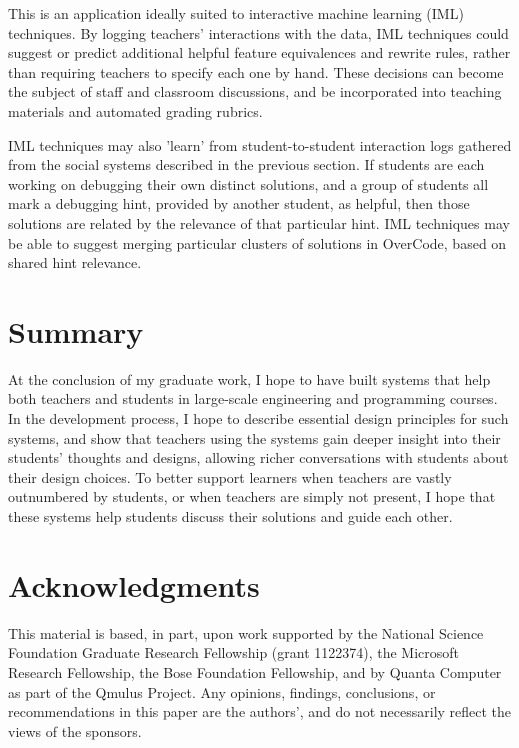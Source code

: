 \documentclass{sigchi}
\begin{document}
This is an application ideally suited to interactive machine learning (IML) techniques. By logging teachers' interactions with the data, IML techniques could suggest or predict additional helpful feature equivalences and rewrite rules, rather than requiring teachers to specify each one by hand. These decisions can become the subject of staff and classroom discussions, and be incorporated into teaching materials and automated grading rubrics.

IML techniques may also 'learn' from student-to-student interaction logs gathered from the social systems described in the previous section. If students are each working on debugging their own distinct solutions, and a group of students all mark a debugging hint, provided by another student, as helpful, then those solutions are related by the relevance of that particular hint. IML techniques may be able to suggest merging particular clusters of solutions in OverCode, based on shared hint relevance.

\section{Summary}
At the conclusion of my graduate work, I hope to have built systems that help both teachers and students in large-scale engineering and programming courses. In the development process, I hope to describe essential design principles for such systems, and show that teachers using the systems gain deeper insight into their students' thoughts and designs, allowing richer conversations with students about their design choices. To better support learners when teachers are vastly outnumbered by students, or when teachers are simply not present, I hope that these systems help students discuss their solutions and guide each other.

\section{Acknowledgments}

This material is based, in part, upon work supported by the National Science Foundation Graduate Research Fellowship (grant 1122374), the Microsoft Research Fellowship, the Bose Foundation Fellowship, and by Quanta Computer as part of the Qmulus Project. Any opinions, findings, conclusions, or recommendations in this paper are the authors', and do not necessarily reflect the views of the sponsors.
\end{document}
